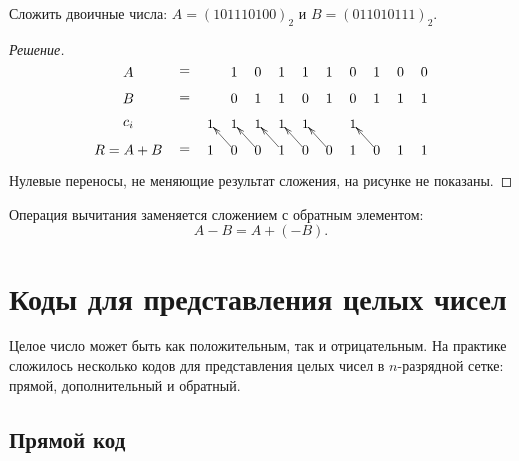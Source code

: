 \begin{Example}
    Сложить двоичные числа:
    $A=(101110100)_2$ и
    $B=(011010111)_2$.
\end{Example}
\begin{proof}[Решение]
    \[
        {\entrymodifiers={}
            {\xymatrix@=1pc{
                A&=
                    &   &1  &0  &1  &1  &1  &0  &1  &0  &0 \\
                B&=
                    &   &0  &1  &1  &0  &1  &0  &1  &1  &1\\
                c_i
                &  
                    &\text{\small{1}}
                        &\text{\small{1}}
                            &\text{\small{1}}
                                &\text{\small{1}}
                                    &\text{\small{1}}
                                        & 
                                            &\text{\small{1}}
                                                & 
                                                    & 
                                                        & \\                    
                R=A+B
                &=
                    &1
                        &0\ar[ul]
                            &0\ar[ul]
                                &1\ar[ul]
                                    &0\ar[ul]
                                        &0\ar[ul]
                                            &1
                                                &0\ar[ul]
                                                    &1
                                                        &1
            }}
        }
    \]
    
    Нулевые переносы, не меняющие результат сложения, на рисунке не показаны.
\end{proof}

Операция вычитания заменяется сложением с обратным элементом: 
\[A-B = A+(-B).\]

\section{Коды для представления целых чисел}

Целое число может быть как положительным, так и отрицательным. На практике сложилось несколько кодов для представления целых чисел в $n$-разрядной сетке: прямой, дополнительный и обратный.


\subsection{Прямой код}

